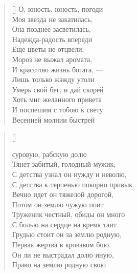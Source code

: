 \newpage
\vspace*{0cm}




\settowidth{\versewidth}{О, юность, юность, погоди\ldotse}
\begin{verse}[\versewidth]
О, юность, юность, погоди\ldotse\\
Моя звезда не закатилась,\\
Она позднее засветилась, ---\\
Надежда-радость впереди\ldotse\\
Еще цветы не отцвели,\\
Мороз не выжал аромата,\\
И красотою жизнь богата, ---\\
Лишь только жажду утоли\ldotst\\
Умерь свой бег, и дай скорей\\
Хоть миг желанного привета\ldotst\\
И поспешим с тобою к свету\\
Весенней молнии быстрей\ldotst
\end{verse}


\newpage
\vspace*{0cm}

\settowidth{\versewidth}{С детства к терпенью покорно привык.}
\begin{verse}[\versewidth]
\begin{patverse*}
 суровую, рабскую долю\\
Тянет забитый, голодный мужик;\\
 С детства узнал он нужду и неволю,\\
С детства к терпенью покорно привык.\\
 Вечно идет он тяжелой дорогой,\\
Потом он землю чужую поит\ldotst\\
 Труженик честный, обиды он много\\
С болью на сердце на время таит\ldotst\\
 Грудью стоит он за землю родную, \\
Первая жертва в кровавом бою.\\
 Он ли не выстрадал долю иную,\\
Право на землю родную свою\ldotsq
\end{patverse*}
\end{verse}

